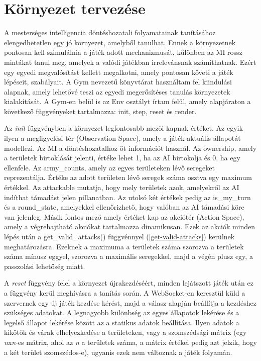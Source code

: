\documentclass[
]{thesis-ekf}
\theoremstyle{definition}
\theoremstyle{remark}
\begin{document}
\section{Környezet tervezése}
\label{környezet-tervezése}

A mesterséges intelligencia döntéshozatali folyamatainak tanításához elengedhetetlen egy jó környezet, amelyből tanulhat. Ennek a környezetnek pontosan kell szimulálnia a játék adott mechanizmusát, különben az MI rossz mintákat tanul meg, amelyek a valódi játékban irrelevánsnak számíthatnak. Ezért egy egyedi megvalósítást kellett megalkotni, amely pontosan követi a játék lépéseit, szabályait. A Gym nevezetű könyvtárat használtam fel kiindulási alapnak, amely lehetővé teszi az egyedi megerősítéses tanulás környezetek kialakítását. A Gym-en belül is az Env osztályt írtam felül, amely alapjáraton a következő függvényeket tartalmazza: init, step, reset és render. 

Az \emph{init} függvényben a környezet legfontosabb mezői kapnak értéket. Az egyik ilyen a megfigyelési tér (Observation Space), amely a játék aktuális állapotát modellezi. Az MI a döntéshozatalhoz öt információt használ. Az ownership, amely a területek birtoklását jelenti, értéke lehet 1, ha az AI birtokolja és 0, ha egy ellenfele. Az army\_counts, amely az egyes területeken lévő seregeket reprezentálja. Értéke az adott területen lévő seregek száma osztva egy maximum értékkel. Az attackable mutatja, hogy mely területek azok, amelyekről az AI indíthat támadást jelen pillanatban. Az utolsó két értékek pedig az is\_my\_turn és a round\_state, amelyekkel ellenőrizhető, hogy valóban az AI támadási köre van jelenleg. Másik fontos mező amely értéket kap az akciótér (Action Space), amely a végrehajtható akciókat tartalmazza dinamikusan. Ezek az akciók minden lépés után a get\_valid\_attacks() függvénnyel (\ref{get-valid-attacks}) kerülnek meghatározásra. Ezeknek a maximuma a területek száma szorozva a területek száma mínusz eggyel, szorozva a maximális seregekkel, majd a végén plusz egy, a passzolási lehetőség miatt. 



A \emph{reset} függvény felel a környezet újrakezdéséért, minden lejátszott játék után ez a függvény kerül meghívásra a tanítás során. A WebSocket-en keresztül küld a szervernek egy új játék kezdése kérést, majd a válasz alapján beállítja a kezdéshez szükséges adatokat. A legnagyobb különbség az egyes állapotok lekérése és a legelső állapot lekérése között az a statikus adatok beállítása. Ilyen adatok a kikötők és várak elhelyezkedése a területeken, vagy a szomszédsági mátrix (egy \emph{n}x\emph{n}-es mátrix, ahol az \emph{n} a területek száma, a mátrix értékei pedig azt jelzik, hogy a két terület szomszédos-e), ugyanis ezek nem változnak a játék folyamán.
\end{document}
